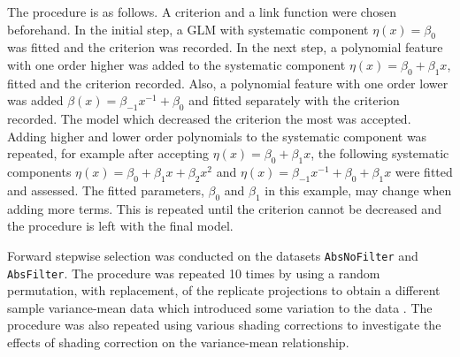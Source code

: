 The procedure is as follows. A criterion and a link function were chosen beforehand. In the initial step, a GLM with systematic component $\eta(x)=\beta_0$ was fitted and the criterion was recorded. In the next step, a polynomial feature with one order higher was added to the systematic component $\eta(x)=\beta_0+\beta_1 x$, fitted and the criterion recorded. Also, a polynomial feature with one order lower was added $\beta(x)=\beta_{-1}x^{-1}+\beta_0$ and fitted separately with the criterion recorded. The model which decreased the criterion the most was accepted. Adding higher and lower order polynomials to the systematic component was repeated, for example after accepting $\eta(x)=\beta_0+\beta_1 x$, the following systematic components $\eta(x)=\beta_0+\beta_1 x+\beta_2x^2$ and $\eta(x)=\beta_{-1}x^{-1}+\beta_0+\beta_1 x$ were fitted and assessed. The fitted parameters, $\beta_0$ and $\beta_1$ in this example, may change when adding more terms. This is repeated until the criterion cannot be decreased and the procedure is left with the final model.

Forward stepwise selection was conducted on the datasets \texttt{AbsNoFilter} and \texttt{AbsFilter}. The procedure was repeated 10 times by using a random permutation, with replacement, of the replicate projections to obtain a different sample variance-mean data which introduced some variation to the data \citep{efron1979bootstrap}. The procedure was also repeated using various shading corrections to investigate the effects of shading correction on the variance-mean relationship.

